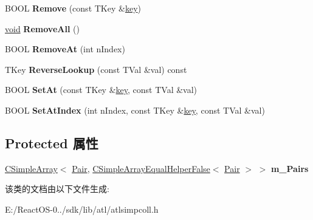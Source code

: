 \begin{DoxyCompactItemize}
\item 
\mbox{\label{class_a_t_l_1_1_c_simple_map_ac7a85fbc5014b7569779d94cbebe1857}} 
B\+O\+OL {\bfseries Remove} (const T\+Key \&\hyperlink{structkey}{key})
\item 
\mbox{\label{class_a_t_l_1_1_c_simple_map_a5e772d411e93059b8cc84dac49e63b30}} 
\hyperlink{interfacevoid}{void} {\bfseries Remove\+All} ()
\item 
\mbox{\label{class_a_t_l_1_1_c_simple_map_a3e623d4e5c514458d1ad16a4e0ff942d}} 
B\+O\+OL {\bfseries Remove\+At} (int n\+Index)
\item 
\mbox{\label{class_a_t_l_1_1_c_simple_map_a6203d2505bdd473ddf2523fdbfa627d2}} 
T\+Key {\bfseries Reverse\+Lookup} (const T\+Val \&val) const
\item 
\mbox{\label{class_a_t_l_1_1_c_simple_map_a3002258c8da889162304ea455822699c}} 
B\+O\+OL {\bfseries Set\+At} (const T\+Key \&\hyperlink{structkey}{key}, const T\+Val \&val)
\item 
\mbox{\label{class_a_t_l_1_1_c_simple_map_a8ba3a4f17308ec3d03d15813d0f96702}} 
B\+O\+OL {\bfseries Set\+At\+Index} (int n\+Index, const T\+Key \&\hyperlink{structkey}{key}, const T\+Val \&val)
\end{DoxyCompactItemize}
\subsection*{Protected 属性}
\begin{DoxyCompactItemize}
\item 
\mbox{\label{class_a_t_l_1_1_c_simple_map_a94379f3484919499164cd960fd6a4bb2}} 
\hyperlink{class_a_t_l_1_1_c_simple_array}{C\+Simple\+Array}$<$ \hyperlink{struct_a_t_l_1_1_c_simple_map_1_1_pair}{Pair}, \hyperlink{class_a_t_l_1_1_c_simple_array_equal_helper_false}{C\+Simple\+Array\+Equal\+Helper\+False}$<$ \hyperlink{struct_a_t_l_1_1_c_simple_map_1_1_pair}{Pair} $>$ $>$ {\bfseries m\+\_\+\+Pairs}
\end{DoxyCompactItemize}


该类的文档由以下文件生成\+:\begin{DoxyCompactItemize}
\item 
E\+:/\+React\+O\+S-\/0../sdk/lib/atl/atlsimpcoll.\+h\end{DoxyCompactItemize}
